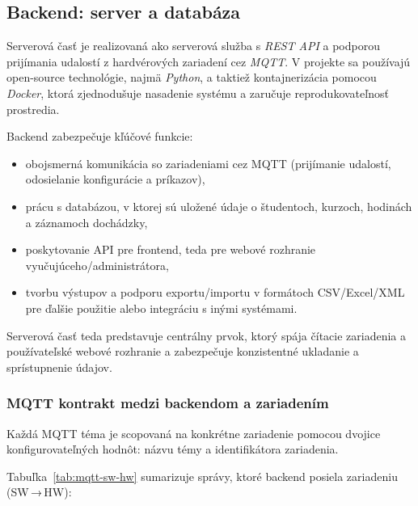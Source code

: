 \subsection{Backend: server a databáza}
Serverová časť je realizovaná ako serverová služba s \textit{REST API} a podporou prijímania udalostí z hardvérových zariadení cez \textit{MQTT}. V projekte sa používajú open-source technológie, najmä \textit{Python}, a taktiež kontajnerizácia pomocou \textit{Docker}, ktorá zjednodušuje nasadenie systému a zaručuje reprodukovateľnosť prostredia.

Backend zabezpečuje kľúčové funkcie:
\begin{itemize}
  \item obojsmerná komunikácia so zariadeniami cez MQTT (prijímanie udalostí, odosielanie konfigurácie a príkazov),
  \item prácu s databázou, v ktorej sú uložené údaje o študentoch, kurzoch, hodinách a záznamoch dochádzky,
  \item poskytovanie API pre frontend, teda pre webové rozhranie vyučujúceho/administrátora,
  \item tvorbu výstupov a podporu exportu/importu v formátoch CSV/Excel/XML pre ďalšie použitie alebo integráciu s inými systémami.
\end{itemize}

Serverová časť teda predstavuje centrálny prvok, ktorý spája čítacie zariadenia a používateľské webové rozhranie a zabezpečuje konzistentné ukladanie a sprístupnenie údajov.

\subsubsection{MQTT kontrakt medzi backendom a zariadením}
Každá MQTT téma je scopovaná na konkrétne zariadenie pomocou dvojice konfigurovateľných hodnôt: názvu témy a identifikátora zariadenia.

Tabuľka~\ref{tab:mqtt-sw-hw} sumarizuje správy, ktoré backend posiela zariadeniu (SW\,→\,HW):

